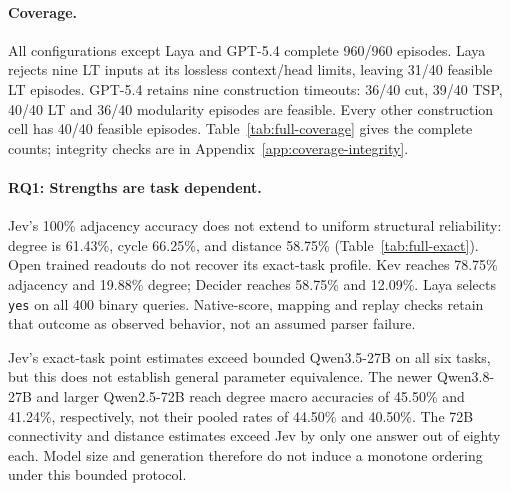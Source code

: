 \paragraph{Coverage.}
All configurations except Laya and GPT-5.4 complete 960/960 episodes.
Laya rejects nine LT inputs at its lossless context/head limits, leaving
31/40 feasible LT episodes. GPT-5.4 retains nine construction timeouts:
36/40 cut, 39/40 TSP, 40/40 LT and 36/40 modularity episodes are feasible.
Every other construction cell has 40/40 feasible episodes.
Table~\ref{tab:full-coverage} gives the complete counts; integrity checks
are in Appendix~\ref{app:coverage-integrity}.

\begin{table}[t]
\centering\small
\resizebox{\textwidth}{!}{}
\caption{Canonical exact-task macro-size accuracy (\%). Qwen4/9/27 G denote
Qwen3.5 no-thinking grammar configurations; other Qwen generations are named.
GPT default-reasoning anchors form a separate lower block.}
\label{tab:full-exact}
\end{table}

\paragraph{RQ1: Strengths are task dependent.}
Jev's 100\% adjacency accuracy does not extend to uniform structural
reliability: degree is 61.43\%, cycle 66.25\%, and distance 58.75\%
(Table~\ref{tab:full-exact}). Open trained readouts do not recover its
exact-task profile. Kev reaches 78.75\% adjacency and 19.88\% degree;
Decider reaches 58.75\% and 12.09\%. Laya selects \texttt{yes} on all
400 binary queries. Native-score, mapping and replay checks retain that
outcome as observed behavior, not an assumed parser failure.

Jev's exact-task point estimates exceed bounded Qwen3.5-27B on all six
tasks, but this does not establish general parameter equivalence.
The newer Qwen3.8-27B and larger Qwen2.5-72B reach degree macro accuracies
of 45.50\% and 41.24\%, respectively, not their pooled rates of 44.50\%
and 40.50\%. The 72B connectivity and distance estimates exceed Jev by
only one answer out of eighty each. Model size and generation therefore
do not induce a monotone ordering under this bounded protocol.

\begin{table}[t]
\centering\small

\caption{Primary construction outcome: mean additive objective gap over
feasible completions; lower is better. Units differ across columns.
All cells use forty episodes except Laya LT (31), GPT-5.4 cut (36),
TSP (39) and modularity (36). Different coverage is not a matched-subset
comparison.}
\label{tab:full-gaps}
\end{table}

